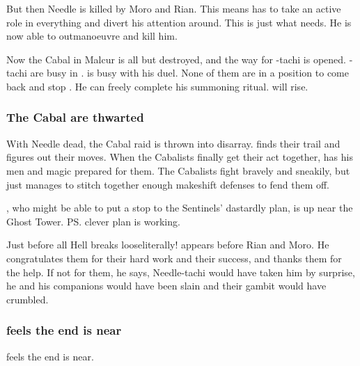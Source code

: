 \begin{garbage}
But then Needle is killed by Moro and Rian. 
This means \Paerzim{} has to take an active role in everything and divert his attention around. 
This is just what \Psyrex{} needs. 
He is now able to outmanoeuvre \Paerzim{} and kill him. 

Now the Cabal in Malcur is all but destroyed, and the way for \Psyrex-tachi is opened. 
\Achsah-tachi are busy in \Forklin. 
\Teshrial{} is busy with his duel. 
None of them are in a position to come back and stop \Psyrex. 
He can freely complete his summoning ritual. 
\Nithdornazsh{} will rise. 





\subsubsection{The Cabal are thwarted}
With Needle dead, the Cabal raid is thrown into disarray. 
\Psyrex{} finds their trail and figures out their moves. 
When the Cabalists finally get their act together, \Psyrex{} has his men and magic prepared for them. 
The Cabalists fight bravely and sneakily, but \Psyrex{} just manages to stitch together enough makeshift defenses to fend them off. 

\Achsah, who might be able to put a stop to the Sentinels' dastardly plan, is up near the Ghost Tower. \ps{\Secherdamon} clever plan is working. 

Just before all Hell breaks loose\dash literally!\dash\Psyrex{} appears before Rian and Moro. He congratulates them for their hard work and their success, and thanks them for the help. If not for them, he says, Needle-tachi would have taken him by surprise, he and his companions would have been slain and their gambit would have crumbled. 







\subsubsection{\Tiroco{} feels the end is near}
\Tiroco{} feels the end is near. 


\end{garbage}
